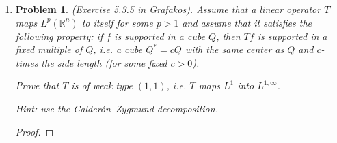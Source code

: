 \documentclass[a4paper]{article}
\newtheorem*{problem}{Problem}
\begin{document}
\begin{enumerate}
\begin{proof}
    Therefore, $m(\xi) = m(\frac{1}{a} \xi)$ for all $\xi$. Combining this with the fact that $m$ is odd, we know $m(\xi) = c \textup{ sgn} (\xi)$ for
    some $c>0$, and $T$ is a multiple of the Hilbert transform.

  \end{proof}

\item
  \begin{problem}
    (Exercise 5.3.5 in Grafakos). Assume that a linear operator  $ T$ maps $L^p (\mathbb R^n)$ to itself for some $p >1$ and assume that it satisfies the following property: if $f$ is supported in a cube $Q$, then $Tf$ is supported in a fixed multiple of $Q$, i.e. a cube $Q^* = c Q$ with the same center as $Q$ and $c$-times the side length (for some fixed $c>0$).

    Prove that $T$ is of weak type $(1,1)$, i.e. $T$ maps $L^1$ into $L^{1,\infty}$.

    Hint: use the Calder\'{o}n--Zygmund decomposition.
  \end{problem}

  \begin{proof}

  \end{proof}

\end{enumerate}
\end{document}
